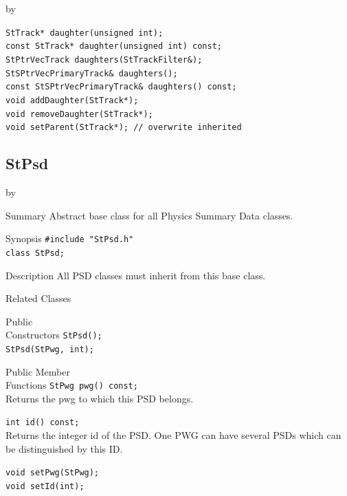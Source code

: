 \documentclass[twoside]{article}
\newcommand{\entrylabel}[1]{\mbox{\textbf{{#1}}}\hfil}%
\newenvironment{entry}
{\begin{list}{}%
    {\renewcommand{\makelabel}{\entrylabel}%
     \setlength{\labelwidth}{90pt}%
     \setlength{\leftmargin}{\labelwidth}
     \advance\leftmargin by \labelsep%
      }%
    }%
  {\end{list}}
\newcommand{\Entrylabel}[1]%
{\raisebox{0pt}[1ex][0pt]{\makebox[\labelwidth][l]%
    {\parbox[t]{\labelwidth}{\hspace{0pt}\textbf{{#1}}}}}}
\newenvironment{Entry}%
{\renewcommand{\entrylabel}{\Entrylabel}\begin{entry}}%
  {\end{entry}}
\begin{document}
\begin{Entry}
    \verb+StTrack* daughter(unsigned int);+\\
    \verb+const StTrack* daughter(unsigned int) const;+\\
    
    \verb+StPtrVecTrack daughters(StTrackFilter&);+\\

    \verb+StSPtrVecPrimaryTrack& daughters();+\\
    \verb+const StSPtrVecPrimaryTrack& daughters() const;+\\

    \verb+void addDaughter(StTrack*);+\\

    \verb+void removeDaughter(StTrack*);+\\

    \verb+void setParent(StTrack*); // overwrite inherited+\\
\end{Entry}
\clearpage

\subsection{StPsd}
\label{sec:StPsd} 
\begin{Entry}
\item[Summary]
    Abstract base class for all Physics Summary Data classes.
    
\item[Synopsis]
    \verb+#include "StPsd.h"+\\
    \verb+class StPsd;+\\
\item[Description]
    All PSD classes must inherit from this base class.
    
\item[Related Classes]
\item[Public\\ Constructors]
    \verb+StPsd();+\\
    \verb+StPsd(StPwg, int);+\\
\item[Public Member\\ Functions]
    \verb+StPwg pwg() const;+\\
    Returns the pwg to which this PSD belongs.
    
    \verb+int id() const;+\\
    Returns the integer id of the PSD. One PWG can have several
    PSDs which can be distinguished by this ID.
    
    \verb+void setPwg(StPwg);+\\
    \verb+void setId(int);+\\
\end{Entry}
\clearpage
\end{document}
